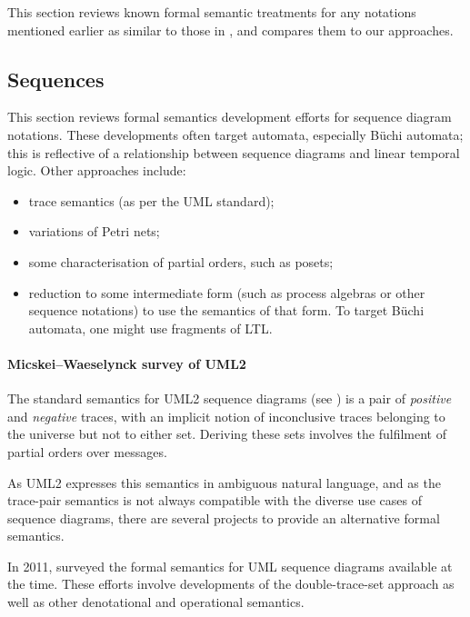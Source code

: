 
This section reviews known formal semantic treatments for any notations
mentioned earlier as similar to those in \langname, and compares them to
our approaches.

\subsection{Sequences}\label{sec:semantics-comparison-review-seq}

This section reviews formal semantics development efforts for sequence diagram
notations.
These developments often
target automata, especially B\"uchi automata; this
is reflective of a relationship between sequence diagrams
and linear temporal logic.
Other approaches include:

\begin{itemize}
  \item trace semantics (as per the UML standard);
  \item variations of Petri nets;
  \item some characterisation of partial orders, such as posets;
  \item reduction to some intermediate form (such as process algebras or other
    sequence notations) to use the semantics of that form.  To target B\"uchi
    automata, one might use fragments of LTL.
\end{itemize}

\paragraph{Micskei--Waeselynck survey of UML2}

The standard semantics for UML2 sequence diagrams (see
\cite[\S 17.2.3.1]{uml251}) is a pair of \emph{positive} and \emph{negative}
traces, with an implicit notion of inconclusive traces belonging to
the universe but not to either set.  Deriving these sets involves the
fulfilment of partial orders over messages.

As UML2 expresses this
semantics in ambiguous natural language, and as the trace-pair
semantics is not always compatible with the diverse use cases of sequence
diagrams, there are several projects to provide an alternative formal semantics.

In 2011, \textcite{Micskei11-UMLSeqSemaSurvey} surveyed
the formal semantics for UML sequence diagrams available at the time.  These
efforts involve developments of the double-trace-set approach as well as other
denotational and operational semantics.

